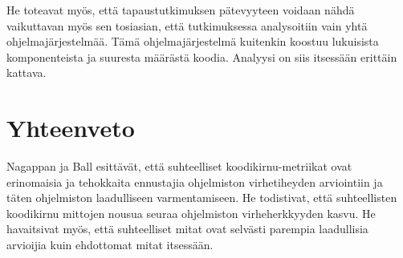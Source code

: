 \documentclass[finnish]{../tktltiki2}
\theoremstyle{definition}
\theoremstyle{remark}
\begin{document}
He toteavat myös, että tapaustutkimuksen pätevyyteen voidaan nähdä vaikuttavan myös sen tosiasian, että tutkimuksessa analysoitiin vain yhtä ohjelmajärjestelmää. Tämä ohjelmajärjestelmä kuitenkin koostuu lukuisista komponenteista ja suuresta määrästä koodia. Analyysi on siis itsessään erittäin kattava.

\section{Yhteenveto}

Nagappan ja Ball esittävät, että suhteelliset koodikirnu-metriikat ovat erinomaisia ja tehokkaita ennustajia ohjelmiston virhetiheyden arviointiin ja täten ohjelmiston laadulliseen varmentamiseen. He todistivat, että suhteellisten koodikirnu mittojen nousua seuraa ohjelmiston virheherkkyyden kasvu. He havaitsivat myös, että suhteelliset mitat ovat selvästi parempia laadullisia arvioijia kuin ehdottomat mitat itsessään.




\end{document}
